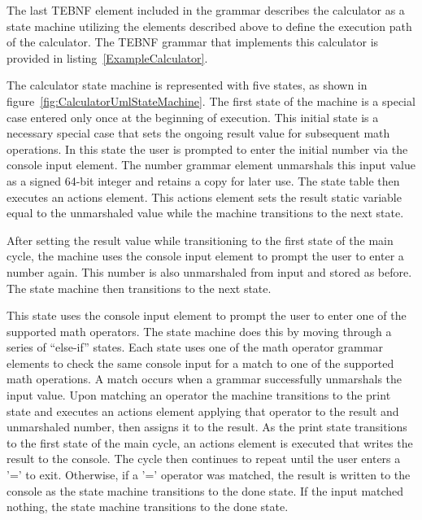 \indent
The last TEBNF element included in the grammar describes the calculator as a state machine utilizing the elements described above to define the execution path of the calculator.  The TEBNF grammar that implements this calculator is provided in listing~\ref{ExampleCalculator}.

\indent
The calculator state machine is represented with five states, as shown in figure~\ref{fig:CalculatorUmlStateMachine}.  The first state of the machine is a special case entered only once at the beginning of execution.  This initial state is a necessary special case that sets the ongoing result value for subsequent math operations.  In this state the user is prompted to enter the initial number via the console input element.  The number grammar element unmarshals this input value as a signed 64-bit integer and retains a copy for later use.  The state table then executes an actions element.  This actions element sets the result static variable equal to the unmarshaled value while the machine transitions to the next state.

\indent
After setting the result value while transitioning to the first state of the main cycle, the machine uses the console input element to prompt the user to enter a number again.  This number is also unmarshaled from input and stored as before.  The state machine then transitions to the next state.

\indent
This state uses the console input element to prompt the user to enter one of the supported math operators.  The state machine does this by moving through a series of “else-if” states.  Each state uses one of the math operator grammar elements to check the same console input for a match to one of the supported math operations.  A match occurs when a grammar successfully unmarshals the input value.  Upon matching an operator the machine transitions to the print state and executes an actions element applying that operator to the result and unmarshaled number, then assigns it to the result.  As the print state transitions to the first state of the main cycle, an actions element is executed that writes the result to the console.  The cycle then continues to repeat until the user enters a '=' to exit.  Otherwise, if a '=' operator was matched, the result is written to the console as the state machine transitions to the done state.  If the input matched nothing, the state machine transitions to the done state.

